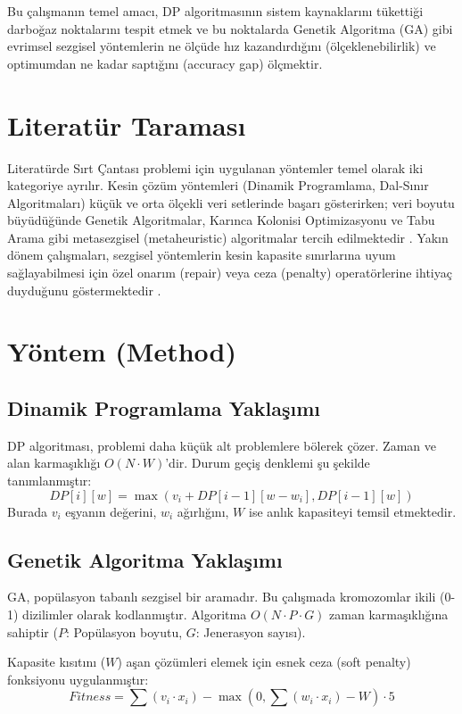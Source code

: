 \documentclass[conference]{IEEEtran}
\begin{document}
Bu çalışmanın temel amacı, DP algoritmasının sistem kaynaklarını tükettiği darboğaz noktalarını tespit etmek ve bu noktalarda Genetik Algoritma (GA) gibi evrimsel sezgisel yöntemlerin ne ölçüde hız kazandırdığını (ölçeklenebilirlik) ve optimumdan ne kadar saptığını (accuracy gap) ölçmektir.

\section{Literatür Taraması}
Literatürde Sırt Çantası problemi için uygulanan yöntemler temel olarak iki kategoriye ayrılır. Kesin çözüm yöntemleri (Dinamik Programlama, Dal-Sınır Algoritmaları) küçük ve orta ölçekli veri setlerinde başarı gösterirken; veri boyutu büyüdüğünde Genetik Algoritmalar, Karınca Kolonisi Optimizasyonu ve Tabu Arama gibi metasezgisel (metaheuristic) algoritmalar tercih edilmektedir \cite{b2}. Yakın dönem çalışmaları, sezgisel yöntemlerin kesin kapasite sınırlarına uyum sağlayabilmesi için özel onarım (repair) veya ceza (penalty) operatörlerine ihtiyaç duyduğunu göstermektedir \cite{b3}.

\section{Yöntem (Method)}

\subsection{Dinamik Programlama Yaklaşımı}
DP algoritması, problemi daha küçük alt problemlere bölerek çözer. Zaman ve alan karmaşıklığı $O(N \cdot W)$'dir. Durum geçiş denklemi şu şekilde tanımlanmıştır:
\begin{equation}
DP[i][w] = \max(v_i + DP[i-1][w-w_i], DP[i-1][w])\label{eq:dp}
\end{equation}
Burada $v_i$ eşyanın değerini, $w_i$ ağırlığını, $W$ ise anlık kapasiteyi temsil etmektedir.

\subsection{Genetik Algoritma Yaklaşımı}
GA, popülasyon tabanlı sezgisel bir aramadır. Bu çalışmada kromozomlar ikili (0-1) dizilimler olarak kodlanmıştır. Algoritma $O(N \cdot P \cdot G)$ zaman karmaşıklığına sahiptir ($P$: Popülasyon boyutu, $G$: Jenerasyon sayısı).

Kapasite kısıtını ($W$) aşan çözümleri elemek için esnek ceza (soft penalty) fonksiyonu uygulanmıştır:
\begin{equation}
Fitness = \sum (v_i \cdot x_i) - \max(0, \sum (w_i \cdot x_i) - W) \cdot 5\label{eq:ga}
\end{equation}
\end{document}
